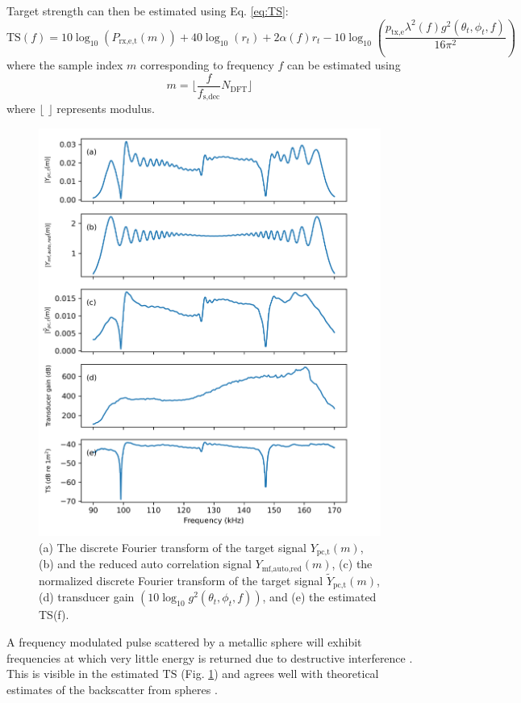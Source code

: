 \documentclass[preprint,12pt,TurnOnLineNumbers]{JASAnew}
\newcommand{\freqsym}{f}
\newcommand{\samplesymf}{m}
\newcommand{\fsdec}{f_{\textrm{s,dec}}}
\newcommand{\ptxe}{p_{\textrm{tx,e}}}
\newcommand{\ypctargetf}{Y_{\textrm{pc,t}}}
\newcommand{\ypctargetnormf}{\tilde{Y}_{\textrm{pc,t}}}
\newcommand{\ymfautoredf}{Y_{\textrm{mf,auto,red}}}
\newcommand{\prxetf}{P_{\textrm{rx,e,t}}}
\newcommand{\ts}{\textrm{TS}}
\newcommand{\range}{r}
\newcommand{\athw}{\phi}
\newcommand{\along}{\theta}
\newcommand{\gain}{g}
\newcommand{\wlen}{\lambda}
\newcommand{\absorp}{\alpha}
\newcommand{\ndft}{{N_{\textrm{DFT}}}}
\begin{document}
Target strength can then be estimated using Eq. \ref{eq:TS}:
\begin{equation}
\label{eq:TS_f}
\ts(\freqsym) = 10\log_{10}(\prxetf(\samplesymf)) + 40\log_{10}(\range_t) + 2\absorp(\freqsym)\range_t - 10\log_{10}\left( \frac{\ptxe \wlen^2(\freqsym) \gain^2(\along_t,\athw_t,f)}{16\pi^2} \right)
\end{equation}
where the sample index $\samplesymf$ corresponding to frequency $\freqsym$ can be estimated using
\begin{equation}
\label{eq:m(f)}
\samplesymf = \lfloor \frac{\freqsym}{\fsdec} \ndft \rfloor 
\end{equation}
where $\lfloor$ $\rfloor$ represents modulus.
%
\begin{figure}
\includegraphics[width=16cm]{Fig_TS}
\caption{\label{fi:TS} (a) The discrete Fourier transform of the target signal $\ypctargetf(\samplesymf)$, (b) and the reduced auto correlation signal $\ymfautoredf(\samplesymf)$, (c) the normalized discrete Fourier transform of the target signal $\ypctargetnormf(\samplesymf)$, (d) transducer gain $(10\log_{10}\gain^2(\along_t,\athw_t,\freqsym))$, and (e) the estimated TS(f).}
\end{figure}
%
A frequency modulated pulse scattered by a metallic sphere will exhibit frequencies at which very little energy is returned due to destructive interference \citep{stanton2008}. This is visible in the estimated $\ts$ (Fig. \ref{fi:TS}) and agrees well with theoretical estimates of the backscatter from spheres \citep{maclennan1981}.
\end{document}
